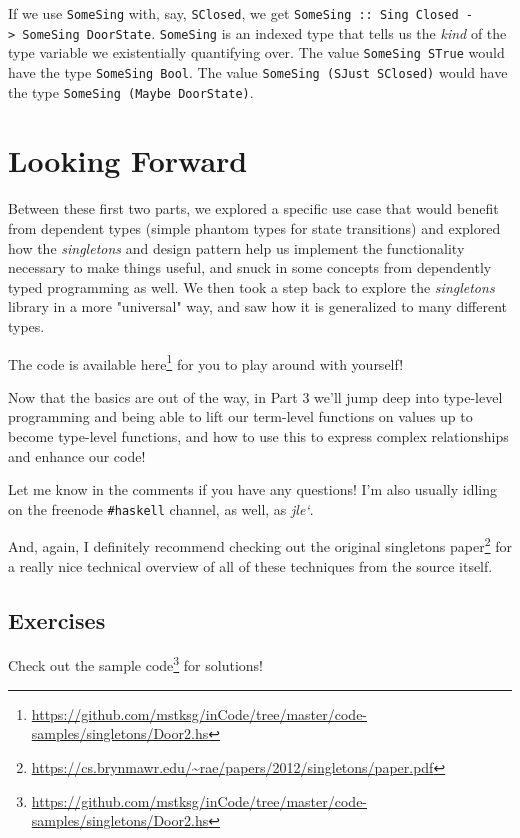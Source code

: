 \documentclass[]{article}
\renewcommand{\href}[2]{#2\footnote{\url{#1}}}
\begin{document}
If we use \texttt{SomeSing} with, say, \texttt{SClosed}, we get
\texttt{SomeSing\ ::\ Sing\ \textquotesingle{}Closed\ -\textgreater{}\ SomeSing\ DoorState}.
\texttt{SomeSing} is an indexed type that tells us the \emph{kind} of the type
variable we existentially quantifying over. The value \texttt{SomeSing\ STrue}
would have the type \texttt{SomeSing\ Bool}. The value
\texttt{SomeSing\ (SJust\ SClosed)} would have the type
\texttt{SomeSing\ (Maybe\ DoorState)}.

\section{Looking Forward}

Between these first two parts, we explored a specific use case that would
benefit from dependent types (simple phantom types for state transitions) and
explored how the \emph{singletons} and design pattern help us implement the
functionality necessary to make things useful, and snuck in some concepts from
dependently typed programming as well. We then took a step back to explore the
\emph{singletons} library in a more "universal" way, and saw how it is
generalized to many different types.

The code is available
\href{https://github.com/mstksg/inCode/tree/master/code-samples/singletons/Door2.hs}{here}
for you to play around with yourself!

Now that the basics are out of the way, in Part 3 we'll jump deep into
type-level programming and being able to lift our term-level functions on values
up to become type-level functions, and how to use this to express complex
relationships and enhance our code!

Let me know in the comments if you have any questions! I'm also usually idling
on the freenode \texttt{\#haskell} channel, as well, as \emph{jle`}.

And, again, I definitely recommend checking out the
\href{https://cs.brynmawr.edu/~rae/papers/2012/singletons/paper.pdf}{original
singletons paper} for a really nice technical overview of all of these
techniques from the source itself.

\subsection{Exercises}

Check out the
\href{https://github.com/mstksg/inCode/tree/master/code-samples/singletons/Door2.hs}{sample
code} for solutions!
\end{document}
